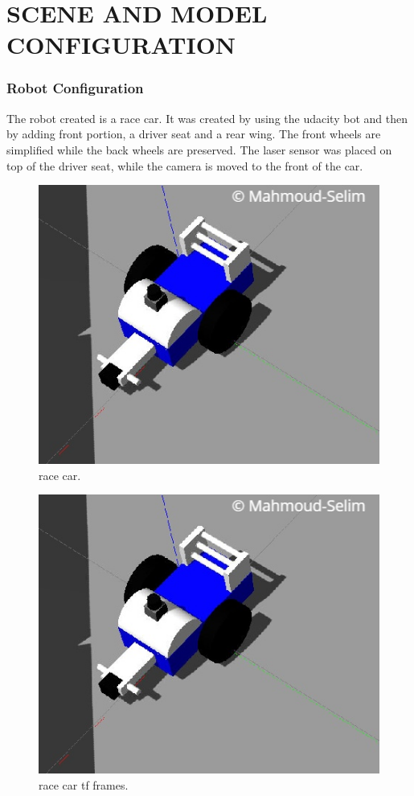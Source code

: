 \documentclass[10pt,journal,compsoc]{IEEEtran}
\begin{document}
\section{SCENE AND MODEL CONFIGURATION}
\subsubsection{Robot Configuration}
The robot created is a race car. It was created by using the udacity bot and then by
adding front portion, a driver seat and a rear wing. The front wheels are simplified while
the back wheels are preserved. The laser sensor was placed on top of the driver seat, while
the camera is moved to the front of the car.
\begin{figure}[thpb]
      \centering
      \includegraphics[width=\linewidth]{race car}
      \caption{race car.}
\end{figure}
\begin{figure}[thpb]
      \centering
      \includegraphics[width=\linewidth]{race car}
      \caption{race car tf frames.}
\end{figure}
\end{document}

